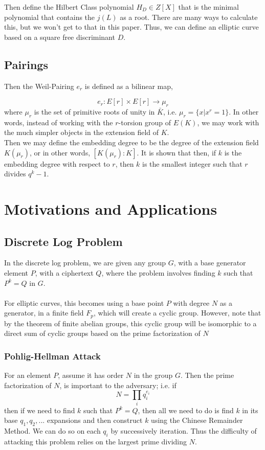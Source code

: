\documentclass[12pt,twoside]{article}
\begin{document}
Then define the Hilbert Class polynomial $H_{D} \in Z[X]$ that is the minimal polynomial that contains the $j(L)$ as a root. There are many ways to calculate this, but we won't get to that in this paper. Thus, we can define an elliptic curve based on a square free discriminant $D$.  

\subsection{Pairings}
Then the Weil-Pairing $e_{r}$ is defined as a bilinear map,  

\begin{equation} 
e_{r}: E[r] \times E[r] \rightarrow \mu_{r}
\end{equation} where $\mu_{r}$ is the set of primitive roots of unity in $\bar{K}$, i.e. $\mu_{r} = \{x | x^{r} =1 \}$. In other words, instead of working with the $r$-torsion group of $E(K)$, we may work with the much simpler objects in the extension field of $K$. \\ 

Then we may define the embedding degree to be the degree of the extension field $K(\mu_{r})$, or in other words, $[K(\mu_{r}): K]$. It is shown that then, if $k$ is the embedding degree with respect to $r$, then $k$ is the smallest integer such that $r$ divides $q^{k} -1$. 
 


\section{Motivations and Applications} 

\subsection{Discrete Log Problem}
In the discrete log problem, we are given any group $G$, with a base generator element $P$, with a ciphertext $Q$, where the problem involves finding $k$ such that $P^{k} = Q$ in $G$. \\ \\
For elliptic curves, this becomes using a base point $P$ with degree $N$ as a generator, in a finite field $F_{p}$, which will create a cyclic group. However, note that by the theorem of finite abelian groups, this cyclic group will be isomorphic to a direct sum of cyclic groups based on the prime factorization of $N$

\subsubsection{Pohlig-Hellman Attack}
For an element $P$, assume it has order $N$ in the group $G$. Then the prime factorization of $N$, is important to the adversary; i.e. if 
$$ N = \prod_{i}q_{i}^{e_{i}} $$ then if we need to find $k$ such that $P^{k} = Q$, then all we need to do is find $k$ in its base $q_{1}, q_{2},...$ expansions and then construct $k$ using the Chinese Remainder Method. We can do so on each $q_{i}$ by successively iteration. Thus the difficulty of attacking this problem relies on the largest prime dividing $N$. 
\end{document}
